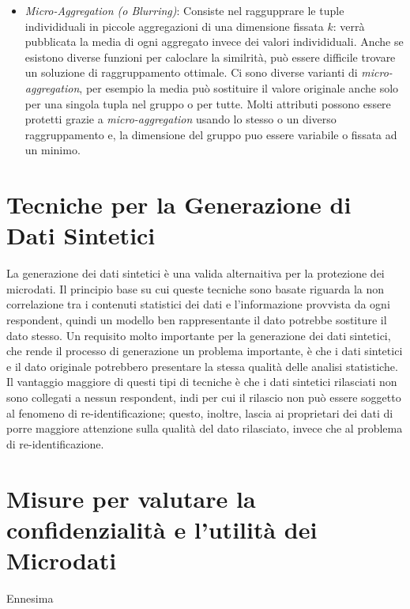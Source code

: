 \begin{itemize}
    \item \textit{Micro-Aggregation (o Blurring)}: Consiste nel raggupprare le tuple individiduali in piccole aggregazioni di una dimensione fissata $k$: verrà pubblicata la media di ogni aggregato invece dei valori individiduali. Anche se esistono diverse funzioni per caloclare la similrità, può essere difficile trovare un soluzione di raggruppamento ottimale. 
    Ci sono diverse varianti di \textit{micro-aggregation}, per esempio la media può sostituire il valore originale anche solo per una singola tupla nel gruppo o per tutte.
    Molti attributi possono essere protetti grazie a \textit{micro-aggregation} usando lo stesso o un diverso raggruppamento e, la dimensione del gruppo puo essere variabile o fissata ad un minimo. 
\end{itemize}
    
\section{Tecniche per la Generazione di Dati Sintetici}
La generazione dei dati sintetici è una valida alternaitiva per la protezione dei microdati. Il principio base su cui queste tecniche sono basate riguarda la non correlazione tra i contenuti statistici dei dati e l'informazione provvista da ogni respondent, quindi un modello ben rappresentante il dato potrebbe sostiture il dato stesso. Un requisito molto importante per la generazione dei dati sintetici, che rende il processo di generazione un problema importante, è che i dati sintetici e il dato originale potrebbero presentare la stessa qualità delle analisi statistiche. Il vantaggio maggiore di questi tipi di tecniche è che i dati sintetici rilasciati non sono collegati a nessun respondent, indi per cui il rilascio non può essere soggetto al fenomeno di re-identificazione; questo, inoltre, lascia ai proprietari dei dati di porre maggiore attenzione sulla qualità del dato rilasciato, invece che al problema di re-identificazione.

\section{Misure per valutare la confidenzialità e l'utilità dei Microdati}
Ennesima